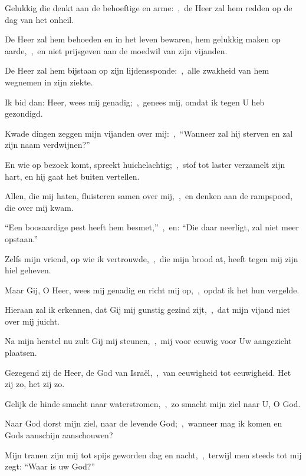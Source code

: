 \documentclass[12pt,twoside,a5paper]{article}
\begin{document}
\begin{halfparskip}

   Gelukkig die denkt aan de behoeftige en arme:~\sep\ de Heer zal hem redden op de dag van het onheil.


  De Heer zal hem behoeden en in het leven bewaren, hem gelukkig maken op aarde,~\sep\ en niet prijsgeven aan de moedwil van zijn vijanden.

  De Heer zal hem bijstaan op zijn lijdenssponde:~\sep\ alle zwakheid van hem wegnemen in zijn ziekte.

  Ik bid dan: Heer, wees mij genadig;~\sep\ genees mij, omdat ik tegen U heb gezondigd.

  Kwade dingen zeggen mijn vijanden over mij:~\sep\ ``Wanneer zal hij sterven en zal zijn naam verdwijnen?''

  En wie op bezoek komt, spreekt huichelachtig;~\sep\ stof tot laster verzamelt zijn hart, en hij gaat het buiten vertellen.

  Allen, die mij haten, fluisteren samen over mij,~\sep\ en denken aan de rampspoed, die over mij kwam.

  ``Een boosaardige pest heeft hem besmet,''~\sep\ en: ``Die daar neerligt, zal niet meer opstaan.''

  Zelfs mijn vriend, op wie ik vertrouwde,~\sep\ die mijn brood at, heeft tegen mij zijn hiel geheven.

  Maar Gij, O Heer, wees mij genadig en richt mij op,~\sep\ opdat ik het hun vergelde.

  Hieraan zal ik erkennen, dat Gij mij gunstig gezind zijt,~\sep\ dat mijn vijand niet over mij juicht.

  Na mijn herstel nu zult Gij mij steunen,~\sep\ mij voor eeuwig voor Uw aangezicht plaatsen.

  Gezegend zij de Heer, de God van Israël,~\sep\ van eeuwigheid tot eeuwigheid. Het zij zo, het zij zo.

   Gelijk de hinde smacht naar waterstromen,~\sep\ zo smacht mijn ziel naar U, O God.

  Naar God dorst mijn ziel, naar de levende God;~\sep\ wanneer mag ik komen en Gods aanschijn aanschouwen?

  Mijn tranen zijn mij tot spijs geworden dag en nacht,~\sep\ terwijl men steeds tot mij zegt: ``Waar is uw God?''


\end{halfparskip}
\end{document}
